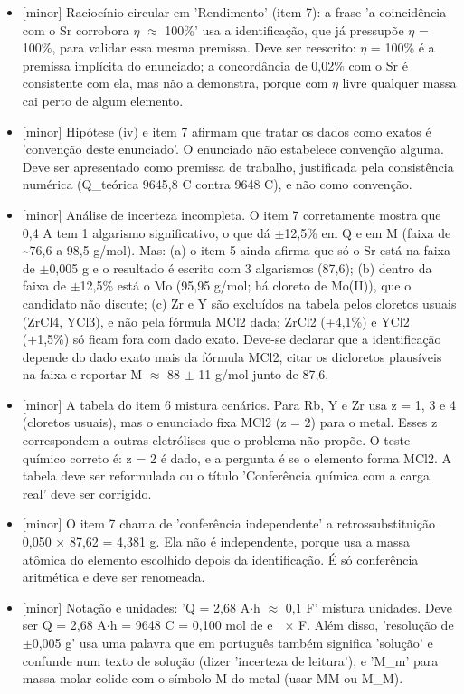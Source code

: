\documentclass{article}%
\begin{document}
\begin{itemize}%
\item%
{[}minor{]} Raciocínio circular em 'Rendimento' (item 7): a frase 'a coincidência com o Sr corrobora $\eta$ $\approx$ 100\%' usa a identificação, que já pressupõe $\eta$ = 100\%, para validar essa mesma premissa. Deve ser reescrito: $\eta$ = 100\% é a premissa implícita do enunciado; a concordância de 0,02\% com o Sr é consistente com ela, mas não a demonstra, porque com $\eta$ livre qualquer massa cai perto de algum elemento.%
\item%
{[}minor{]} Hipótese (iv) e item 7 afirmam que tratar os dados como exatos é 'convenção deste enunciado'. O enunciado não estabelece convenção alguma. Deve ser apresentado como premissa de trabalho, justificada pela consistência numérica (Q\_teórica 9645,8 C contra 9648 C), e não como convenção.%
\item%
{[}minor{]} Análise de incerteza incompleta. O item 7 corretamente mostra que 0,4 A tem 1 algarismo significativo, o que dá $\pm$12,5\% em Q e em M (faixa de \textasciitilde{}76,6 a 98,5 g/mol). Mas: (a) o item 5 ainda afirma que só o Sr está na faixa de $\pm$0,005 g e o resultado é escrito com 3 algarismos (87,6); (b) dentro da faixa de $\pm$12,5\% está o Mo (95,95 g/mol; há cloreto de Mo(II)), que o candidato não discute; (c) Zr e Y são excluídos na tabela pelos cloretos usuais (ZrCl4, YCl3), e não pela fórmula MCl2 dada; ZrCl2 (+4,1\%) e YCl2 (+1,5\%) só ficam fora com dado exato. Deve{-}se declarar que a identificação depende do dado exato mais da fórmula MCl2, citar os dicloretos plausíveis na faixa e reportar M $\approx$ 88 $\pm$ 11 g/mol junto de 87,6.%
\item%
{[}minor{]} A tabela do item 6 mistura cenários. Para Rb, Y e Zr usa z = 1, 3 e 4 (cloretos usuais), mas o enunciado fixa MCl2 (z = 2) para o metal. Esses z correspondem a outras eletrólises que o problema não propõe. O teste químico correto é: z = 2 é dado, e a pergunta é se o elemento forma MCl2. A tabela deve ser reformulada ou o título 'Conferência química com a carga real' deve ser corrigido.%
\item%
{[}minor{]} O item 7 chama de 'conferência independente' a retrossubstituição 0,050 $\times$ 87,62 = 4,381 g. Ela não é independente, porque usa a massa atômica do elemento escolhido depois da identificação. É só conferência aritmética e deve ser renomeada.%
\item%
{[}minor{]} Notação e unidades: 'Q = 2,68 A$\cdot$h $\approx$ 0,1 F' mistura unidades. Deve ser Q = 2,68 A$\cdot$h = 9648 C = 0,100 mol de e$^{-}$ $\times$ F. Além disso, 'resolução de $\pm$0,005 g' usa uma palavra que em português também significa 'solução' e confunde num texto de solução (dizer 'incerteza de leitura'), e 'M\_m' para massa molar colide com o símbolo M do metal (usar MM ou M\_M).%
\end{itemize}%
\end{document}
